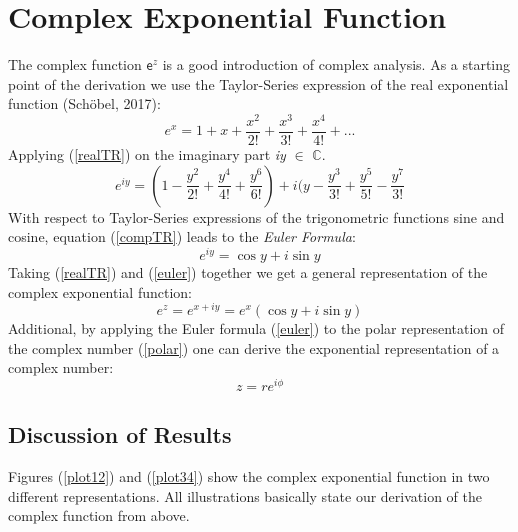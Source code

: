 \documentclass[a4paper,11pt]{article}
\begin{document}
\section{Complex Exponential Function}
The complex function $\mathsf{e}^z$ is a good introduction of complex analysis. As a starting point of the derivation we use the Taylor-Series expression of the real exponential function (Sch\"obel, 2017):
\begin{equation}
e^{x}=1 + x + \dfrac{x^2}{2!}+\dfrac{x^3}{3!}+\dfrac{x^4}{4!}+...
\label{realTR}
\end{equation}
Applying (\ref{realTR}) on the imaginary part \textit{iy} $\in$ $\mathbb{C}$.
\begin{equation}
e^{iy}=(1 - \dfrac{y^2}{2!}+\dfrac{y^4}{4!}+\dfrac{y^6}{6!})+ i(y - \dfrac{y^3}{3!} + \dfrac{y^5}{5!} - \dfrac{y^7}{3!}
\label{compTR}
\end{equation}
With respect to Taylor-Series expressions of the trigonometric functions sine and cosine, equation (\ref{compTR}) leads to the \textit{Euler Formula}:
\begin{equation}
e^{iy}= \cos y + i \sin y
\label{euler}
\end{equation}
Taking (\ref{realTR}) and (\ref{euler}) together we get a general representation of the complex exponential function:
\begin{equation}
e^{z}=e^{x+iy}=e^{x} (\cos y + i \sin y)
\label{gce}
\end{equation}
Additional, by applying the Euler formula (\ref{euler}) to the polar representation of the complex number (\ref{polar}) one can derive the exponential representation of a complex number:
\begin{equation}
z=re^{i\phi}
\label{gce}
\end{equation}
\subsection{Discussion of Results}
Figures (\ref{plot12}) and (\ref{plot34}) show the complex exponential function in two different representations. All illustrations basically state our derivation of the complex function from above. 
\end{document}
